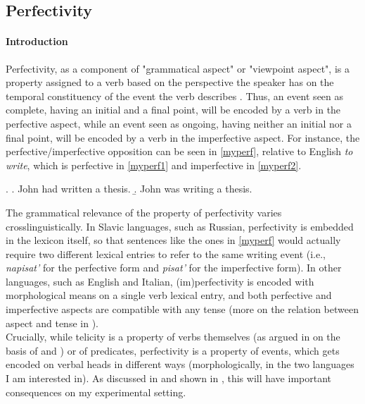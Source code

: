 \subsection{Perfectivity} 

\paragraph{Introduction}
Perfectivity, as a component of "grammatical aspect" or "viewpoint aspect", is a property assigned to a verb based on the perspective the speaker has on the temporal constituency of the event the verb describes \parencite{comrie1976aspect}. Thus, an event seen as complete, having an initial and a final point, will be encoded by a verb in the perfective aspect, while an event seen as ongoing, having neither an initial nor a final point, will be encoded by a verb in the imperfective aspect. For instance, the perfective/imperfective opposition can be seen in \ref{myperf}, relative to English \textit{to write}, which is perfective in \ref{myperf1} and imperfective in \ref{myperf2}.

\ex. \label{myperf} \a. \label{myperf1} John had written a thesis.
\b. \label{myperf2} John was writing a thesis.

The grammatical relevance of the property of perfectivity varies crosslinguistically. In Slavic languages, such as Russian, perfectivity is embedded in the lexicon itself, so that sentences like the ones in \ref{myperf} would actually require two different lexical entries to refer to the same writing event (i.e., \textit{napisat'} for the perfective form and \textit{pisat'} for the imperfective form). In other languages, such as English and Italian, (im)perfectivity is encoded with morphological means on a single verb lexical entry, and both perfective and imperfective aspects are compatible with any tense (more on the relation between aspect and tense in ).\\
Crucially, while telicity is a property of verbs themselves (as argued in  on the basis of \textcite{Olsen1997} and \textcite{Medina2007}) or of predicates, perfectivity is a property of events, which gets encoded on verbal heads in different ways (morphologically, in the two languages I am interested in). As discussed in  and shown in , this will have important consequences on my experimental setting.

